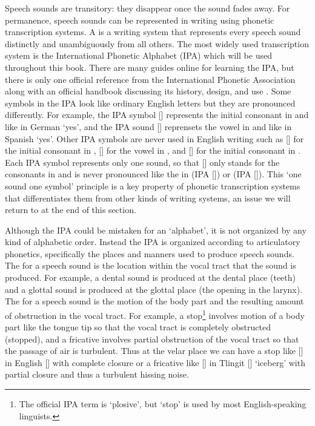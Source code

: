 Speech sounds are transitory: they disappear once the sound fades away.
For permanence, speech sounds can be represented in writing using phonetic transcription systems.
A  is a writing system that represents every speech sound distinctly and unambiguously from all others.
The most widely used transcription system is the International Phonetic Alphabet (IPA) which will be used throughout this book.
There are many guides online for learning the IPA, but there is only one official reference from the International Phonetic Association \parencite{international-phonetic-association:2018} along with an official handbook discussing its history, design, and use \parencite{international-phonetic-association:1999}.
Some symbols in the IPA look like ordinary English letters but they are pronounced differently.
For example, the IPA symbol [] represents the initial consonant in  and  like in German  ‘yes’, and the IPA sound [] reprensets the vowel in  and  like in Spanish  ‘yes’.
Other IPA symbols are never used in English writing such as [] for the initial consonant in , [] for the vowel in , and [] for the initial consonant in .
Each IPA symbol represents only one sound, so that [] only stands for the consonants in  and is never pronounced like the  in  (IPA []) or  (IPA []).
This ‘one sound one symbol’ principle is a key property of phonetic transcription systems that differentiates them from other kinds of writing systems, an issue we will return to at the end of this section.

Although the IPA could be mistaken for an ‘alphabet’, it is not organized by any kind of alphabetic order.
Instead the IPA is organized according to articulatory phonetics, specifically the places and manners used to produce speech sounds.
The  for a speech sound is the location within the vocal tract that the sound is produced.
For example, a dental sound is produced at the dental place (teeth) and a glottal sound is produced at the glottal place (the opening in the larynx).
The  for a speech sound is the motion of the body part and the resulting amount of obstruction in the vocal tract.
For example, a stop\footnote{The official IPA term is ‘plosive’, but ‘stop’ is used by most English-speaking linguists.} involves motion of a body part like the tongue tip so that the vocal tract is completely obstructed (stopped), and a fricative involves partial obstruction of the vocal tract so that the passage of air is turbulent.
Thus at the velar place we can have a stop like [] in English  [] with complete closure or a fricative like [] in Tlingit  [] ‘iceberg’ with partial closure and thus a turbulent hissing noise.

